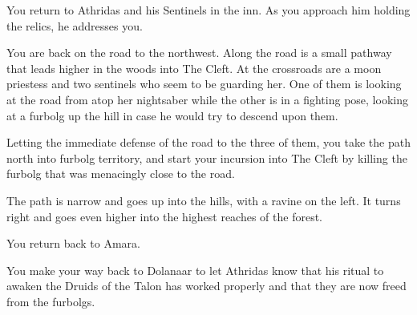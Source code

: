
You return to Athridas and his Sentinels in the inn. As you approach him holding the relics, he addresses you.




You are back on the road to the northwest. Along the road is a small pathway that leads higher in the woods into The Cleft. At the crossroads are a moon priestess and two sentinels who seem to be guarding her. One of them is looking at the road from atop her nightsaber while the other is in a fighting pose, looking at a furbolg up the hill in case he would try to descend upon them.



Letting the immediate defense of the road to the three of them, you take the path north into furbolg territory, and start your incursion into The Cleft by killing the furbolg that was menacingly close to the road.

The path is narrow and goes up into the hills, with a ravine on the left. It turns right and goes even higher into the highest reaches of the forest.


You return back to Amara.


You make your way back to Dolanaar to let Athridas know that his ritual to awaken the Druids of the Talon has worked properly and that they are now freed from the furbolgs.


